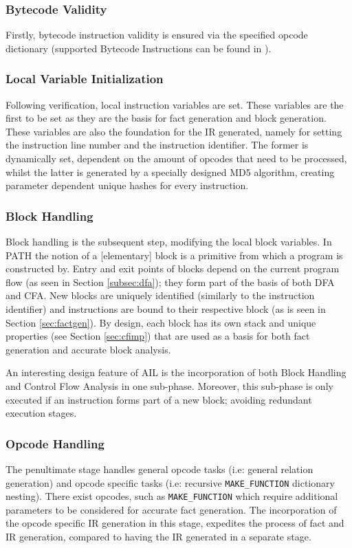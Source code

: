             \subsubsection*{Bytecode Validity}
            Firstly, bytecode instruction validity is ensured via the specified opcode dictionary (supported Bytecode Instructions can be found in ).
            \subsubsection*{Local Variable Initialization}
            \par Following verification, local instruction variables are set. These variables are the first to be set as they are the basis for fact generation and block generation. These variables are also the foundation for the \acs{IR} generated, namely for setting the instruction line number 
            and the instruction identifier. The former is dynamically set, dependent on the amount of opcodes that need to be processed, whilst the latter is generated by a specially designed \acs{MD5} algorithm, creating parameter dependent unique hashes for every instruction.
            \subsubsection*{Block Handling}
            \par Block handling is the subsequent step, modifying the local block variables. In \acs{PATH} the notion of a [elementary] block is a primitive from which a program is constructed by. Entry and exit points of blocks depend on the current program flow (as seen in Section \ref{subsec:dfa}); they form part of the 
            basis of both \acs{DFA} and \acs{CFA}. New blocks are uniquely identified (similarly to the instruction identifier) and instructions are bound to their respective block (as is seen in Section \ref{sec:factgen}). By design, each block
            has its own stack and unique properties (see Section \ref{sec:cfimp}) that are used as a basis for both fact generation and accurate block analysis.
            \par An interesting design feature of \acs{AIL} is the incorporation of both Block Handling and Control Flow Analysis in one sub-phase. Moreover, this sub-phase is only executed if an instruction forms part of a new block; avoiding redundant execution stages.  
            \subsubsection*{Opcode Handling}
            \par The penultimate stage handles general opcode tasks (i.e: general relation generation) and opcode specific tasks (i.e: recursive \lstinline|MAKE_FUNCTION| dictionary nesting). There exist opcodes, such as \lstinline|MAKE_FUNCTION| which require additional parameters to be considered for accurate fact generation. The incorporation of the opcode specific \acs{IR} generation in this stage, expedites the process of fact and IR generation, compared to 
            having the \acs{IR} generated in a separate stage.
